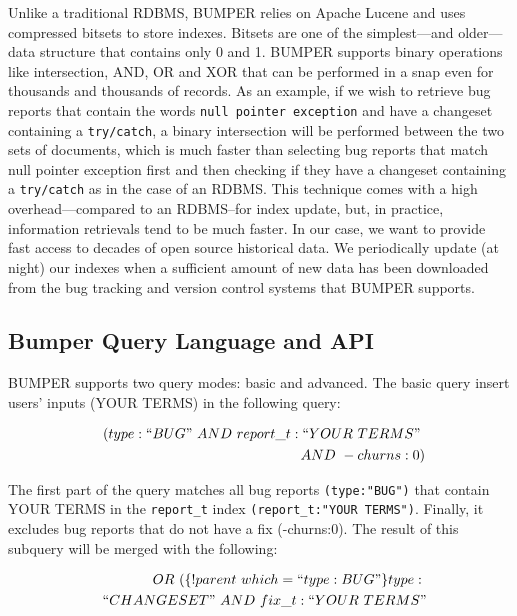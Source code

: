 \documentclass[12pt]{report}
\begin{document}
Unlike a traditional RDBMS, BUMPER relies on Apache Lucene and uses
compressed bitsets to store indexes. Bitsets are one of the
simplest---and older---data structure that contains only 0 and 1. BUMPER
supports binary operations like intersection, AND, OR and XOR that can
be performed in a snap even for thousands and thousands of records. As
an example, if we wish to retrieve bug reports that contain the words
\lstinline!null pointer exception! and have a changeset containing a
\lstinline!try/catch!, a binary intersection will be performed between
the two sets of documents, which is much faster than selecting bug
reports that match null pointer exception first and then checking if
they have a changeset containing a \lstinline!try/catch! as in the case
of an RDBMS. This technique comes with a high overhead---compared to an
RDBMS--for index update, but, in practice, information retrievals tend
to be much faster. In our case, we want to provide fast access to
decades of open source historical data. We periodically update (at
night) our indexes when a sufficient amount of new data has been
downloaded from the bug tracking and version control systems that BUMPER
supports.

\subsection{\texorpdfstring{Bumper Query Language and API
\label{sub:Bumper Query Language and API}}{Bumper Query Language and API }}\label{bumper-query-language-and-api}

BUMPER supports two query modes: basic and advanced. The basic query
insert users' inputs (YOUR TERMS) in the following query:

\begin{equation}
\begin{split}
~~(type:``BUG"~AND~report\_t:``YOUR~TERMS"~\\
~~AND~-churns:0)
\end{split}
\end{equation}

The first part of the query matches all bug reports
\lstinline!(type:"BUG")! that contain YOUR TERMS in the
\lstinline!report_t! index \lstinline!(report_t:"YOUR TERMS")!. Finally,
it excludes bug reports that do not have a fix (-churns:0). The result
of this subquery will be merged with the following:

\begin{equation}
\begin{split}
~~OR~(\{!parent~which=``type:BUG"\}type:~\\
~~``CHANGESET"~AND~fix\_t:``YOUR~TERMS"
\end{split}
\end{equation}
\end{document}
